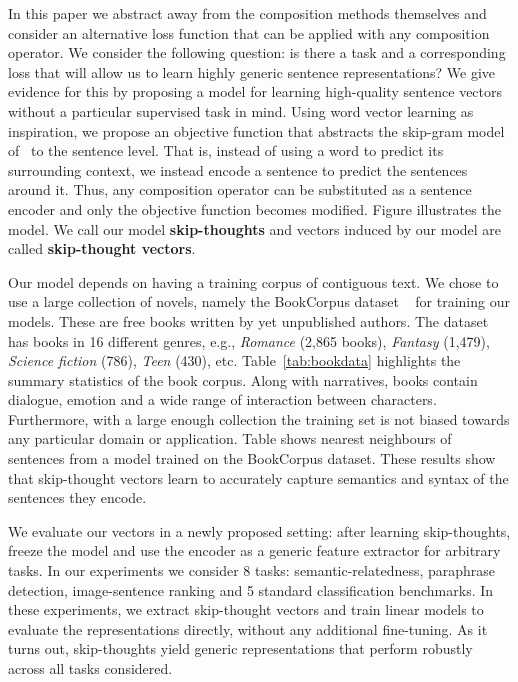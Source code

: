 \documentclass{article} \usepackage{nips15submit_e,times}
\begin{document}
In this paper we abstract away from the composition methods themselves and consider an alternative loss function that can be applied with any composition operator. We consider the following question: is there a task and a corresponding loss that will allow us to learn highly generic sentence representations? We give evidence for this by proposing a model for learning high-quality sentence vectors without a particular supervised task in mind. Using word vector learning as inspiration, we propose an objective function that abstracts the skip-gram model of~\cite{mikolov2013efficient} to the sentence level. That is, instead of using a word to predict its surrounding context, we instead encode a sentence to predict the sentences around it. Thus, any composition operator can be substituted as a sentence encoder and only the objective function becomes modified. Figure  illustrates the model. We call our model {\bf skip-thoughts} and vectors induced by our model are called {\bf skip-thought vectors}.

Our model depends on having a training corpus of contiguous text. We chose to use a large collection of novels, namely the BookCorpus dataset ~\cite{moviebook15} for training our models. These are free books written by yet unpublished authors. The dataset has books in 16 different genres, e.g., \emph{Romance} (2,865 books), \emph{Fantasy} (1,479), \emph{Science fiction} (786), \emph{Teen} (430), etc.  Table~\ref{tab:bookdata} highlights the summary statistics of the book corpus. Along with narratives, books contain dialogue, emotion and a wide range of interaction between characters. Furthermore, with a large enough collection the training set is not biased towards any particular domain or application. Table  shows nearest neighbours of sentences from a model trained on the BookCorpus dataset. These results show that skip-thought vectors learn to accurately capture semantics and syntax of the sentences they encode.

We evaluate our vectors in a newly proposed setting: after learning skip-thoughts, freeze the model and use the encoder as a generic feature extractor for arbitrary tasks. In our experiments we consider 8 tasks: semantic-relatedness, paraphrase detection, image-sentence ranking and 5 standard classification benchmarks. In these experiments, we extract skip-thought vectors and train linear models to evaluate the representations directly, without any additional fine-tuning. As it turns out, skip-thoughts yield generic representations that perform robustly across all tasks considered.
\end{document}
